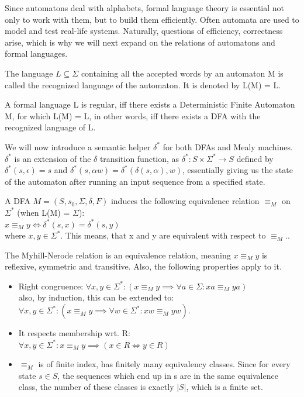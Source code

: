 Since automatons deal with alphabets, formal language theory is essential not only to work with them, but to build them efficiently. Often automata are used to model and test real-life systems. Naturally, questions of efficiency, correctness arise, which is why we will next expand on the relations of automatons and formal languages.

\begin{definition}
	The language $L\subseteq\Sigma$ containing all the accepted words by an automaton M is called the recognized language of the automaton. It is denoted by L(M) = L.
\end{definition}

\begin{definition}
	A formal language L is regular, iff there exists a Deterministic Finite Automaton M, for which L(M) = L, in other words, iff there exists a DFA with the recognized language of L.
\end{definition}

We will now introduce a semantic helper $\delta^*$ for both DFAs and Mealy machines. $\delta^*$ is an extension of the $\delta$ transition function, as $\delta^*: S\times\Sigma^* \to S$ defined by $\delta^*(s,\epsilon) = s$ and $\delta^*(s, \alpha w) = \delta^*(\delta(s, \alpha), w)$, essentially giving us the state of the automaton after running an input sequence from a specified state.

\begin{definition} 
	A DFA $M=(S,s_{0},\Sigma,\delta,F)$ induces the following equivalence relation $\equiv_M$ on $\Sigma^*$ (when L(M) = $\Sigma$):\\
	\null\qquad$x\equiv_M y \iff \delta^*(s, x) = \delta^*(s, y)$\\
	where $x, y\in\Sigma^*$. This means, that x and y are equivalent with respect to $\equiv_M$.\cite{Kozen1977}.
\end{definition}

The Myhill-Nerode relation is an equivalence relation, meaning $x\equiv_M y$ is reflexive, symmetric and transitive. Also, the following properties apply to it\cite{Kozen1977}.

\begin{itemize}
	\item Right congruence: $\forall x, y\in\Sigma^*: (x\equiv_M y \implies 		\forall a\in\Sigma: xa\equiv_Mya)$\\ also, by induction, this can be extended to:\\
	$\forall x, y\in\Sigma^*: (x\equiv_M y \implies \forall w\in\Sigma^*: xw\equiv_Myw)$. 
	\item It respects membership wrt. R:\\
	$\forall x, y\in\Sigma^*: x\equiv_M y \implies (x\in R \iff y\in R)$
	\item $\equiv_M$ is of finite index, has finitely many equivalency classes. Since for every state $s\in S$, the sequences which end up in s are in the same equivalence class, the number of these classes is exactly $|S|$, which is a finite set.
\end{itemize}

